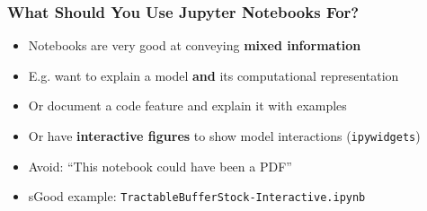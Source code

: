 \documentclass[aspectratio=169]{beamer}
\begin{document}
\begin{frame}
\frametitle{What Should You Use Jupyter Notebooks For?}
\begin{itemize}
	\item Notebooks are very good at conveying \textbf{mixed information}
	
	\item E.g. want to explain a model \textbf{and} its computational representation
	
	\item <2->Or document a code feature and explain it with examples
	
	\item <2->Or have \textbf{interactive figures} to show model interactions (\texttt{ipywidgets})
	
	\item <3->Avoid: ``This notebook could have been a PDF''
	
	\item <4->sGood example: \texttt{TractableBufferStock-Interactive.ipynb}
\end{itemize}
\end{frame}
\end{document}
